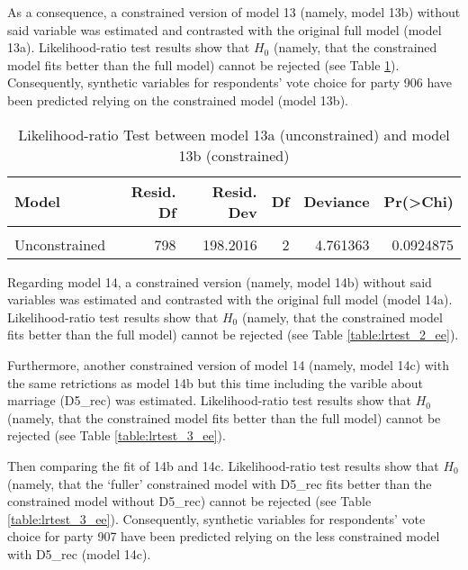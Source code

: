 \documentclass[
]{article}
\begin{document}
As a consequence, a constrained version of model 13 (namely, model 13b) without said variable was
estimated and contrasted with the original full model (model 13a). Likelihood-ratio test results show
that \(H_0\) (namely, that the constrained model fits better than the full model) cannot be rejected
(see Table \ref{table:lrtest_1_ee}). Consequently, synthetic variables for respondents' vote choice for
party 906 have been predicted relying on the constrained model (model 13b).

\begin{table}[!h]

\caption{\label{tab:unnamed-chunk-53}Likelihood-ratio Test between model 13a (unconstrained) and model 13b (constrained) \label{table:lrtest_1_ee}}
\centering
\begin{tabular}[t]{l|r|r|r|r|r}
\hline
Model & Resid. Df & Resid. Dev & Df & Deviance & Pr(>Chi)\\
\hline
\cellcolor{gray!6}{Constrained} & \cellcolor{gray!6}{800} & \cellcolor{gray!6}{202.9630} & \cellcolor{gray!6}{} & \cellcolor{gray!6}{} & \cellcolor{gray!6}{}\\
\hline
Unconstrained & 798 & 198.2016 & 2 & 4.761363 & 0.0924875\\
\hline
\end{tabular}
\end{table}

Regarding model 14, a constrained version (namely, model 14b) without said variables was
estimated and contrasted with the original full model (model 14a).
Likelihood-ratio test results show that \(H_0\) (namely, that the constrained model fits better than the full model) cannot be rejected (see Table \ref{table:lrtest_2_ee}).

Furthermore, another constrained version of model 14 (namely, model 14c) with the same retrictions as model 14b but this time including the varible about marriage (D5\_rec) was estimated. Likelihood-ratio test results show that \(H_0\) (namely, that the constrained model fits better than the full model) cannot be rejected (see Table \ref{table:lrtest_3_ee}).

Then comparing the fit of 14b and 14c. Likelihood-ratio test results show that \(H_0\) (namely, that the `fuller' constrained model with D5\_rec fits better than the constrained model without D5\_rec) cannot be rejected (see Table \ref{table:lrtest_3_ee}). Consequently, synthetic variables for respondents' vote choice for party 907 have been predicted relying on the less constrained model with D5\_rec (model 14c).
\end{document}
